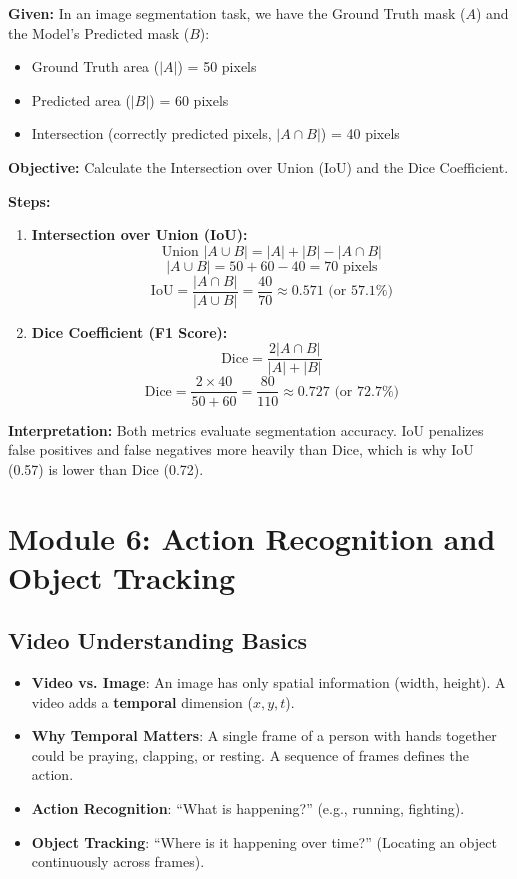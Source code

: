 \documentclass[11pt,a4paper]{article}
\begin{document}
\vspace{1em}

\begin{tcolorbox}[colback=gray!5!white,colframe=black!75!black,title=\textbf{Numerical 2: IoU and Dice Coefficient}]
\textbf{Given:}
In an image segmentation task, we have the Ground Truth mask ($A$) and the Model's Predicted mask ($B$):
\begin{itemize}
    \item Ground Truth area ($|A|$) = 50 pixels
    \item Predicted area ($|B|$) = 60 pixels
    \item Intersection (correctly predicted pixels, $|A \cap B|$) = 40 pixels
\end{itemize}

\textbf{Objective:} Calculate the Intersection over Union (IoU) and the Dice Coefficient.

\textbf{Steps:}
\begin{enumerate}
    \item \textbf{Intersection over Union (IoU):}
    \[ \text{Union } |A \cup B| = |A| + |B| - |A \cap B| \]
    \[ |A \cup B| = 50 + 60 - 40 = 70 \text{ pixels} \]
    \[ \text{IoU} = \frac{|A \cap B|}{|A \cup B|} = \frac{40}{70} \approx 0.571 \text{ (or 57.1\%)} \]
    
    \item \textbf{Dice Coefficient (F1 Score):}
    \[ \text{Dice} = \frac{2 |A \cap B|}{|A| + |B|} \]
    \[ \text{Dice} = \frac{2 \times 40}{50 + 60} = \frac{80}{110} \approx 0.727 \text{ (or 72.7\%)} \]
\end{enumerate}

\textbf{Interpretation:} Both metrics evaluate segmentation accuracy. IoU penalizes false positives and false negatives more heavily than Dice, which is why IoU (0.57) is lower than Dice (0.72).
\end{tcolorbox}


\newpage

\section{Module 6: Action Recognition and Object Tracking}

\subsection{Video Understanding Basics}
\begin{itemize}
    \item \textbf{Video vs. Image}: An image has only spatial information (width, height). A video adds a \textbf{temporal} dimension ($x, y, t$).
    \item \textbf{Why Temporal Matters}: A single frame of a person with hands together could be praying, clapping, or resting. A sequence of frames defines the action.
    \item \textbf{Action Recognition}: ``What is happening?'' (e.g., running, fighting).
    \item \textbf{Object Tracking}: ``Where is it happening over time?'' (Locating an object continuously across frames).
\end{itemize}
\end{document}
